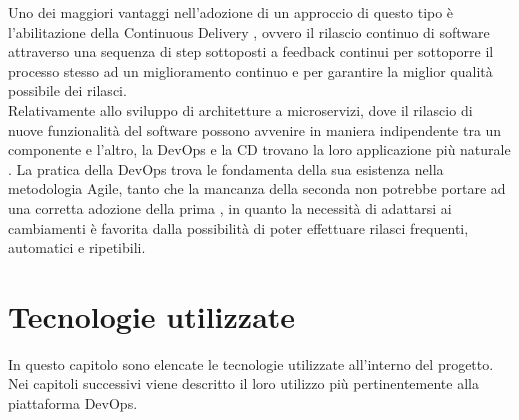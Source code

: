 \documentclass[a4paper, 12pt]{report}
\numberwithin{equation}{section}
\begin{document}
Uno dei maggiori vantaggi nell’adozione di un approccio di questo tipo è l’abilitazione della Continuous Delivery \cite{chen-devops}, ovvero il rilascio continuo di software attraverso una sequenza di step sottoposti a feedback continui per sottoporre il processo stesso ad un miglioramento continuo e per garantire la miglior qualità possibile dei rilasci.\\
Relativamente allo sviluppo di architetture a microservizi, dove il rilascio di nuove funzionalità del software possono avvenire in maniera indipendente tra un componente e l’altro, la DevOps e la CD trovano la loro applicazione più naturale \cite{balalaie-devops}.
La pratica della DevOps trova le fondamenta della sua esistenza nella metodologia Agile, tanto che la mancanza della seconda non potrebbe portare ad una corretta adozione della prima \cite{lwakatare-devops}, in quanto la necessità di adattarsi ai cambiamenti è favorita dalla possibilità di poter effettuare rilasci frequenti, automatici e ripetibili.

\chapter{Tecnologie utilizzate}
In questo capitolo sono elencate le tecnologie utilizzate all’interno del progetto. Nei capitoli successivi viene descritto il loro utilizzo più pertinentemente alla piattaforma DevOps.
\end{document}
